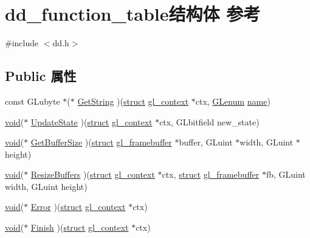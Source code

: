 \hypertarget{structdd__function__table}{}\section{dd\+\_\+function\+\_\+table结构体 参考}
\label{structdd__function__table}


{\ttfamily \#include $<$dd.\+h$>$}

\subsection*{Public 属性}
\begin{DoxyCompactItemize}
\item 
const G\+Lubyte $\ast$($\ast$ \hyperlink{structdd__function__table_a9806da3e2614187f5e154ffada409570}{Get\+String} )(\hyperlink{interfacestruct}{struct} \hyperlink{structgl__context}{gl\+\_\+context} $\ast$ctx, \hyperlink{interfacevoid}{G\+Lenum} \hyperlink{structname}{name})
\item 
\hyperlink{interfacevoid}{void}($\ast$ \hyperlink{structdd__function__table_a4275da33e8cc71c5e39a64759d5d3b38}{Update\+State} )(\hyperlink{interfacestruct}{struct} \hyperlink{structgl__context}{gl\+\_\+context} $\ast$ctx, G\+Lbitfield new\+\_\+state)
\item 
\hyperlink{interfacevoid}{void}($\ast$ \hyperlink{structdd__function__table_a8453cd558af6878530ab7a88a21ee64c}{Get\+Buffer\+Size} )(\hyperlink{interfacestruct}{struct} \hyperlink{structgl__framebuffer}{gl\+\_\+framebuffer} $\ast$buffer, G\+Luint $\ast$width, G\+Luint $\ast$height)
\item 
\hyperlink{interfacevoid}{void}($\ast$ \hyperlink{structdd__function__table_ab08456af9890bc6cd4aa7b202d63ab09}{Resize\+Buffers} )(\hyperlink{interfacestruct}{struct} \hyperlink{structgl__context}{gl\+\_\+context} $\ast$ctx, \hyperlink{interfacestruct}{struct} \hyperlink{structgl__framebuffer}{gl\+\_\+framebuffer} $\ast$fb, G\+Luint width, G\+Luint height)
\item 
\hyperlink{interfacevoid}{void}($\ast$ \hyperlink{structdd__function__table_abc8c0b95063ce845d9e26d53b370e02c}{Error} )(\hyperlink{interfacestruct}{struct} \hyperlink{structgl__context}{gl\+\_\+context} $\ast$ctx)
\item 
\hyperlink{interfacevoid}{void}($\ast$ \hyperlink{structdd__function__table_a3d15abc006c0aa92f1b467cd29d8e2b4}{Finish} )(\hyperlink{interfacestruct}{struct} \hyperlink{structgl__context}{gl\+\_\+context} $\ast$ctx)
\item 

\end{DoxyCompactItemize}
